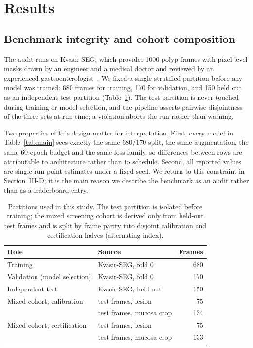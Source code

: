 \documentclass[journal]{IEEEtran}
\begin{document}
\section{Results}

\subsection{Benchmark integrity and cohort composition}

The audit runs on Kvasir-SEG, which provides 1000 polyp frames with pixel-level masks drawn by an engineer and a medical doctor and reviewed by an experienced gastroenterologist~\cite{jha2020kvasir}. We fixed a single stratified partition before any model was trained: 680 frames for training, 170 for validation, and 150 held out as an independent test partition (Table~\ref{tab:partitions}). The test partition is never touched during training or model selection, and the pipeline asserts pairwise disjointness of the three sets at run time; a violation aborts the run rather than warning.

Two properties of this design matter for interpretation. First, every model in Table~\ref{tab:main} sees exactly the same 680/170 split, the same augmentation, the same 60-epoch budget and the same loss family, so differences between rows are attributable to architecture rather than to schedule. Second, all reported values are single-run point estimates under a fixed seed. We return to this constraint in Section~III-D; it is the main reason we describe the benchmark as an audit rather than as a leaderboard entry.

\begin{table}[t]
\centering
\caption{Partitions used in this study. The test partition is isolated before training; the mixed screening cohort is derived only from held-out test frames and is split by frame parity into disjoint calibration and certification halves (alternating index).}
\label{tab:partitions}
\begin{tabular}{llr}
\toprule
Role & Source & Frames \\
\midrule
Training & Kvasir-SEG, fold 0 & 680 \\
Validation (model selection) & Kvasir-SEG, fold 0 & 170 \\
Independent test & Kvasir-SEG, held out & 150 \\
\midrule
Mixed cohort, calibration & test frames, lesion & 75 \\
 & test frames, mucosa crop & 134 \\
Mixed cohort, certification & test frames, lesion & 75 \\
 & test frames, mucosa crop & 133 \\
\bottomrule
\end{tabular}
\end{table}
\end{document}
